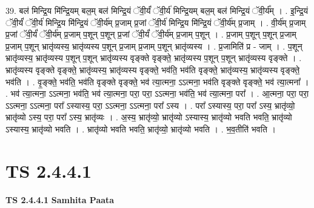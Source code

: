 \documentclass[17pt]{extarticle}
\begin{document}
39. बल॑ मिन्द्रि॒य मि॑न्द्रि॒यम् बल॒म् बल॑ मिन्द्रि॒यं ॅवी॒र्यं॑ ॅवी॒र्य॑ मिन्द्रि॒यम् बल॒म् बल॑ मिन्द्रि॒यं ॅवी॒र्य᳚म् । . इ॒न्द्रि॒यं ॅवी॒र्यं॑ ॅवी॒र्य॑ मिन्द्रि॒य मि॑न्द्रि॒यं ॅवी॒र्य॑म् प्र॒जाम् प्र॒जां ॅवी॒र्य॑ मिन्द्रि॒य मि॑न्द्रि॒यं ॅवी॒र्य॑म् प्र॒जाम् । . वी॒र्य॑म् प्र॒जाम् प्र॒जां ॅवी॒र्यं॑ ॅवी॒र्य॑म् प्र॒जाम् प॒शून् प॒शून् प्र॒जां ॅवी॒र्यं॑ ॅवी॒र्य॑म् प्र॒जाम् प॒शून् । . प्र॒जाम् प॒शून् प॒शून् प्र॒जाम् प्र॒जाम् प॒शून् भ्रातृ॑व्यस्य॒ भ्रातृ॑व्यस्य प॒शून् प्र॒जाम् प्र॒जाम् प॒शून् भ्रातृ॑व्यस्य । . प्र॒जामिति॑ प्र - जाम् । . प॒शून् भ्रातृ॑व्यस्य॒ भ्रातृ॑व्यस्य प॒शून् प॒शून् भ्रातृ॑व्यस्य वृङ्क्ते वृङ्क्ते॒ भ्रातृ॑व्यस्य प॒शून् प॒शून् भ्रातृ॑व्यस्य वृङ्क्ते । . भ्रातृ॑व्यस्य वृङ्क्ते वृङ्क्ते॒ भ्रातृ॑व्यस्य॒ भ्रातृ॑व्यस्य वृङ्क्ते॒ भव॑ति॒ भव॑ति वृङ्क्ते॒ भ्रातृ॑व्यस्य॒ भ्रातृ॑व्यस्य वृङ्क्ते॒ भव॑ति । . वृ॒ङ्क्ते॒ भव॑ति॒ भव॑ति वृङ्क्ते वृङ्क्ते॒ भव॑ त्या॒त्मना॒ ऽऽत्मना॒ भव॑ति वृङ्क्ते वृङ्क्ते॒ भव॑ त्या॒त्मना᳚ । . भव॑ त्या॒त्मना॒ ऽऽत्मना॒ भव॑ति॒ भव॑ त्या॒त्मना॒ परा॒ परा॒ ऽऽत्मना॒ भव॑ति॒ भव॑ त्या॒त्मना॒ परा᳚ । . आ॒त्मना॒ परा॒ परा॒ ऽऽत्मना॒ ऽऽत्मना॒ परा᳚ ऽस्यास्य॒ परा॒ ऽऽत्मना॒ ऽऽत्मना॒ परा᳚ ऽस्य । . परा᳚ ऽस्यास्य॒ परा॒ परा᳚ ऽस्य॒ भ्रातृ॑व्यो॒ भ्रातृ॑व्यो ऽस्य॒ परा॒ परा᳚ ऽस्य॒ भ्रातृ॑व्यः । . अ॒स्य॒ भ्रातृ॑व्यो॒ भ्रातृ॑व्यो ऽस्यास्य॒ भ्रातृ॑व्यो भवति भवति॒ भ्रातृ॑व्यो ऽस्यास्य॒ भ्रातृ॑व्यो भवति । . भ्रातृ॑व्यो भवति भवति॒ भ्रातृ॑व्यो॒ भ्रातृ॑व्यो भवति । . भ॒व॒तीति॑ भवति । \newline
\pagebreak
{}

\section{ TS 2.4.4.1 }

\textbf{TS 2.4.4.1 } \newline
\textbf{Samhita Paata} \newline
\end{document}
